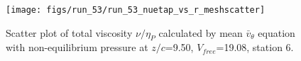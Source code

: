 \begin{figure}[H]
\centering
\texttt{[image: figs/run\_53/run\_53\_nuetap\_vs\_r\_meshscatter]}
\caption{Scatter plot of total viscosity $\nu / \eta_P$ calculated by mean $\bar{v}_{\theta}$ equation with non-equilibrium pressure at $z/c$=9.50, $V_{free}$=19.08, station 6.}
\label{fig:run_53_nuetap_vs_r_meshscatter}
\end{figure}


